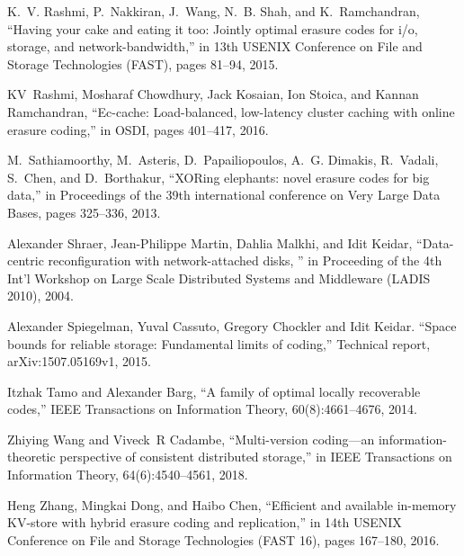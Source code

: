 \begin{thebibliography}{00}
K.~V. Rashmi, P.~Nakkiran, J.~Wang, N.~B. Shah, and K.~Ramchandran,
``Having your cake and eating it too: Jointly optimal erasure codes for
  i/o, storage, and network-bandwidth,''
in 13th USENIX Conference on File and Storage Technologies
  (FAST), pages 81--94, 2015.

KV~Rashmi, Mosharaf Chowdhury, Jack Kosaian, Ion Stoica, and Kannan
  Ramchandran,
``Ec-cache: Load-balanced, low-latency cluster caching with online
  erasure coding,''
in OSDI, pages 401--417, 2016.

M.~Sathiamoorthy, M.~Asteris, D.~Papailiopoulos, A.~G. Dimakis, R.~Vadali,
  S.~Chen, and D.~Borthakur,
``XORing elephants: novel erasure codes for big data,''
in Proceedings of the 39th international conference on Very
  Large Data Bases, pages 325--336, 2013.

Alexander Shraer, Jean-Philippe Martin, Dahlia Malkhi, and Idit Keidar,
``Data-centric reconfiguration with network-attached disks, ''
 in Proceeding of the 4th Int'l Workshop on Large Scale
  Distributed Systems and Middleware (LADIS 2010), 2004.

Alexander Spiegelman, Yuval Cassuto, Gregory Chockler and Idit Keidar.
``Space bounds for reliable storage: Fundamental limits of coding,''
Technical report, arXiv:1507.05169v1, 2015.

Itzhak Tamo and Alexander Barg,
``A family of optimal locally recoverable codes,''
IEEE Transactions on Information Theory, 60(8):4661--4676, 2014.

Zhiying Wang and Viveck~R Cadambe,
``Multi-version coding—an information-theoretic perspective of
  consistent distributed storage,'' in  IEEE Transactions on Information Theory, 64(6):4540--4561,
  2018.

Heng Zhang, Mingkai Dong, and Haibo Chen,
``Efficient and available in-memory KV-store with hybrid erasure coding
  and replication,'' in 14th {USENIX} Conference on File and Storage Technologies
  ({FAST} 16), pages 167--180, 2016.

\end{thebibliography}

